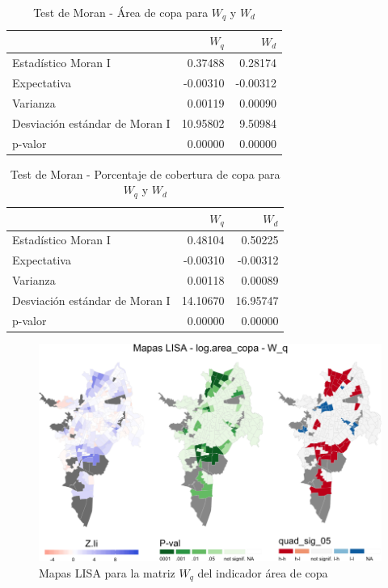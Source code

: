 \documentclass[12pt,a4paper,oneside, openany]{book}
\theoremstyle{definition}
\theoremstyle{definition}
\theoremstyle{definition}
\theoremstyle{remark}
\begin{document}
\begin{table}[H]

\caption{\label{tab:moran-copa-w}Test de Moran - Área de copa para $W_q$ y $W_d$}
\centering
\begin{tabular}{lrr}
\toprule
  & $W_q$ & $W_d$\\
\midrule
Estadístico Moran I & 0.37488 & 0.28174\\
Expectativa & -0.00310 & -0.00312\\
Varianza & 0.00119 & 0.00090\\
Desviación estándar de Moran I & 10.95802 & 9.50984\\
p-valor & 0.00000 & 0.00000\\
\bottomrule
\end{tabular}
\end{table}

\begin{table}[H]

\caption{\label{tab:moran-copaap-w}Test de Moran - Porcentaje de cobertura de copa para $W_q$ y $W_d$}
\centering
\begin{tabular}{lrr}
\toprule
  & $W_q$ & $W_d$\\
\midrule
Estadístico Moran I & 0.48104 & 0.50225\\
Expectativa & -0.00310 & -0.00312\\
Varianza & 0.00118 & 0.00089\\
Desviación estándar de Moran I & 14.10670 & 16.95747\\
p-valor & 0.00000 & 0.00000\\
\bottomrule
\end{tabular}
\end{table}

\begin{figure}[H]

{\centering \includegraphics[width=1\linewidth]{tesis-unigis_files/figure-latex/mapas-lisa-copa-wq-1} 

}

\caption{Mapas LISA para la matriz $W_q$ del indicador área de copa}\label{fig:mapas-lisa-copa-wq}
\end{figure}
\end{document}

